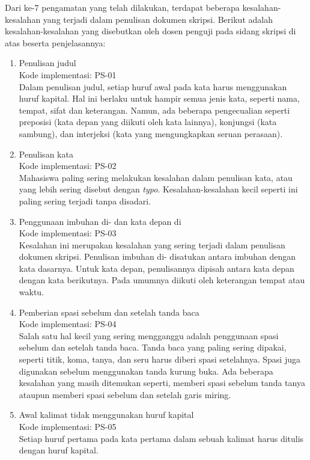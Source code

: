 Dari ke-7 pengamatan yang telah dilakukan, terdapat beberapa kesalahan-kesalahan yang terjadi dalam penulisan dokumen skripsi. Berikut adalah kesalahan-kesalahan yang disebutkan oleh dosen penguji pada sidang skripsi di atas beserta penjelasannya:

\begin{enumerate}
	\item Penulisan judul \\
	Kode implementasi: PS-01 \\	
	Dalam penulisan judul, setiap huruf awal pada kata harus menggunakan huruf kapital. Hal ini berlaku untuk hampir semua jenis kata, seperti nama, tempat, sifat dan keterangan. Namun, ada beberapa pengecualian seperti preposisi (kata depan yang diikuti oleh kata lainnya), konjungsi (kata sambung), dan interjeksi (kata yang mengungkapkan seruan perasaan).
	
	\item Penulisan kata \\
	Kode implementasi: PS-02 \\	
	Mahasiswa paling sering melakukan kesalahan dalam penulisan kata, atau yang lebih sering disebut dengan \textit{typo}. Kesalahan-kesalahan kecil seperti ini paling sering terjadi tanpa disadari.
	
	\item Penggunaan imbuhan di- dan kata depan di\\
	Kode implementasi: PS-03 \\	
	Kesalahan ini merupakan kesalahan yang sering terjadi dalam penulisan dokumen skripsi. Penulisan imbuhan di- disatukan antara imbuhan dengan kata dasarnya. Untuk kata depan, penulisannya dipisah antara kata depan dengan kata berikutnya. Pada umumnya diikuti oleh keterangan tempat atau waktu.
	
	\item Pemberian spasi sebelum dan setelah tanda baca  \\
	Kode implementasi: PS-04 \\	
	Salah satu hal kecil yang sering mengganggu adalah penggunaan spasi sebelum dan setelah tanda baca. Tanda baca yang paling sering dipakai, seperti titik, koma, tanya, dan seru harus diberi spasi setelahnya. Spasi juga digunakan sebelum menggunakan tanda kurung buka. Ada beberapa kesalahan yang masih ditemukan seperti, memberi spasi sebelum tanda tanya ataupun memberi spasi sebelum dan setelah garis miring.

	\item Awal kalimat tidak menggunakan huruf kapital \\
	Kode implementasi: PS-05 \\	
	Setiap huruf pertama pada kata pertama dalam sebuah kalimat harus ditulis dengan huruf kapital. 	
	

\end{enumerate}
